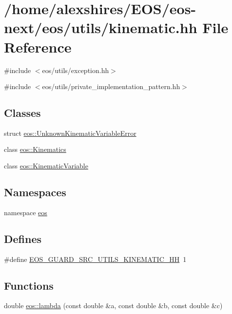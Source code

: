 \hypertarget{kinematic_8hh}{
\section{/home/alexshires/EOS/eos-\/next/eos/utils/kinematic.hh File Reference}
\label{kinematic_8hh}
}
{\ttfamily \#include $<$eos/utils/exception.hh$>$}\par
{\ttfamily \#include $<$eos/utils/private\_\-implementation\_\-pattern.hh$>$}\par
\subsection*{Classes}
\begin{DoxyCompactItemize}
\item 
struct \hyperlink{structeos_1_1UnknownKinematicVariableError}{eos::UnknownKinematicVariableError}
\item 
class \hyperlink{classeos_1_1Kinematics}{eos::Kinematics}
\item 
class \hyperlink{classeos_1_1KinematicVariable}{eos::KinematicVariable}
\end{DoxyCompactItemize}
\subsection*{Namespaces}
\begin{DoxyCompactItemize}
\item 
namespace \hyperlink{namespaceeos}{eos}
\end{DoxyCompactItemize}
\subsection*{Defines}
\begin{DoxyCompactItemize}
\item 
\#define \hyperlink{kinematic_8hh_ae937345f1a0bad883feee65af992f923}{EOS\_\-GUARD\_\-SRC\_\-UTILS\_\-KINEMATIC\_\-HH}~1
\end{DoxyCompactItemize}
\subsection*{Functions}
\begin{DoxyCompactItemize}
\item 
double \hyperlink{namespaceeos_a2e8644357d2012ca279f49ab0037b9ea}{eos::lambda} (const double \&a, const double \&b, const double \&c)
\end{DoxyCompactItemize}


